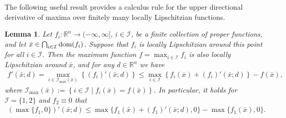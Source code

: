 \documentclass[11pt,a4paper]{article}
\newtheorem{lemma}[theorem]{Lemma}
\theoremstyle{plain}
\begin{document}
The following useful result provides a calculus rule for the upper directional derivative of maxima over finitely many locally Lipschitzian functions.

\begin{lemma}\label{max rule}
Let \( f_i: \mathbb{R}^n \to (-\infty,\infty ] \), \( i \in \mathcal{I} \), be a finite collection of proper functions, and let \( \bar{x} \in \bigcap_{i \in \mathcal{I}} \text{\rm dom}(f_i) \). Suppose that \( f_i \) is locally Lipschitzian around this point for all \( i \in \mathcal{I} \). Then the maximum function  
\( f = \max_{i \in \mathcal{I}} f_i \) is also locally Lipschitzian around \( \bar{x} \), and for any \( d \in \mathbb{R}^n \) we have 
\begin{equation}\label{max rule formula}
\begin{aligned}
f'(\bar{x}; d) = \max_{i \in \mathcal{I}_{\max}(\bar{x})} \left\{ (f_i)'(\bar{x}; d) \right\} \leq 
\max_{i \in \mathcal{I}} \left\{ f_i(\bar{x}) + (f_i)'(\bar{x}; d) \right\} - f(\bar{x}),
\end{aligned}
\end{equation}  
where \( \mathcal{I}_{\max}(\bar{x}) := \left\{ i \in \mathcal{I} \mid f_i(\bar{x}) = f(\bar{x}) \right\} \).  
In particular, it holds for \( \mathcal{I} = \{1, 2\} \) and \( f_2 \equiv 0 \) that
\begin{equation*}
\begin{aligned}
\left( \max\{f_1, 0\} \right)'(\bar{x}; d) \leq \max\{ f_1(\bar x) + (f_1)'(\bar{x}; d), 0 \} - \max\{ f_1(\bar x), 0 \}.
\end{aligned}
\end{equation*}
\end{lemma}
\end{document}
